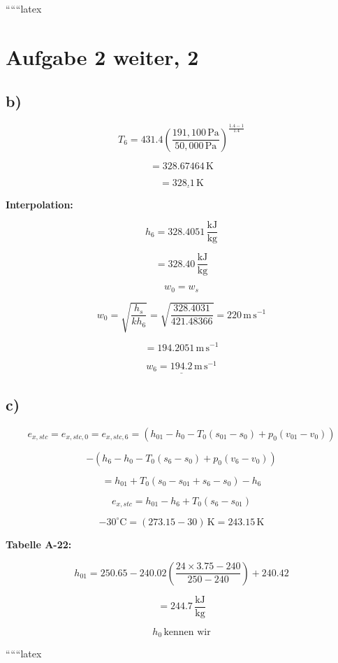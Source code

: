 ``````latex


\section*{Aufgabe 2 weiter, 2}

\subsection*{b)}

\[
T_6 = 431.4 \left( \frac{191,100 \, \text{Pa}}{50,000 \, \text{Pa}} \right)^{\frac{1.4 - 1}{1.4}}
\]

\[
= 328.67464 \, \text{K}
\]

\[
= \underline{328.1 \, \text{K}}
\]

\textbf{Interpolation:}

\[
h_6 = 328.4051 \, \frac{\text{kJ}}{\text{kg}}
\]

\[
= 328.40 \, \frac{\text{kJ}}{\text{kg}}
\]

\[
w_0 = w_s
\]

\[
w_0 = \sqrt{\frac{h_s}{k h_6}} = \sqrt{\frac{328.4031}{421.48366}} = 220 \, \text{m} \, \text{s}^{-1}
\]

\[
= 194.2051 \, \text{m} \, \text{s}^{-1}
\]

\[
\underline{w_6 = 194.2 \, \text{m} \, \text{s}^{-1}}
\]

\subsection*{c)}

\[
e_{x,stc} = e_{x,stc,0} = e_{x,stc,6} = (h_{01} - h_0 - T_0 (s_{01} - s_0) + p_0 (v_{01} - v_0))
\]

\[
- (h_6 - h_0 - T_0 (s_6 - s_0) + p_0 (v_6 - v_0))
\]

\[
= h_{01} + T_0 (s_0 - s_{01} + s_6 - s_0) - h_6
\]

\[
e_{x,stc} = h_{01} - h_6 + T_0 (s_6 - s_{01})
\]

\[
-30^\circ \text{C} = (273.15 - 30) \, \text{K} = 243.15 \, \text{K}
\]

\textbf{Tabelle A-22:}

\[
h_{01} = 250.65 - 240.02 \left( \frac{24 \times 3.75 - 240}{250 - 240} \right) + 240.42
\]

\[
= 244.7 \, \frac{\text{kJ}}{\text{kg}}
\]

\[
h_0 \, \text{kennen wir}
\]

``````latex



